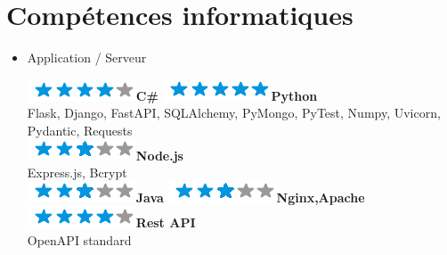 \documentclass[]{friggeri-cv}
\begin{document}
\section{Compétences informatiques}
        \vspace*{-0.45cm}
        \setlength{\columnsep}{-0.3cm}
        \begin{flushleft}
        \begin{multicols}{3}
		\begin{itemize}
		
		\setlength{\itemsep}{5pt}
  		\setlength{\parskip}{0pt}
  		\setlength{\parsep}{0pt}
          
        
\item \large Application / Serveur \
\normalsize
\begin{flushleft}

\includegraphics[scale=0.40]{res/img/4stars.png}\hspace{1.5mm}\textbf{C\#}
\includegraphics[scale=0.40]{res/img/5stars.png}\hspace{1.5mm}\textbf{Python}\\Flask, Django, FastAPI, SQLAlchemy, PyMongo, PyTest, Numpy, Uvicorn, Pydantic, Requests\\\vspace{2mm}
\includegraphics[scale=0.40]{res/img/3stars.png}\hspace{1.5mm}\textbf{Node.js}\\Express.js, Bcrypt\\
\includegraphics[scale=0.40]{res/img/3stars.png}\hspace{1.5mm}\textbf{Java}
\includegraphics[scale=0.40]{res/img/3stars.png}\hspace{1.5mm}\textbf{\small Nginx,Apache}
\includegraphics[scale=0.40]{res/img/4stars.png}\hspace{1.5mm}\textbf{Rest API}\\OpenAPI standard\\
\end{flushleft}            


\end{itemize}
\end{multicols}
\end{flushleft}
\end{document}
